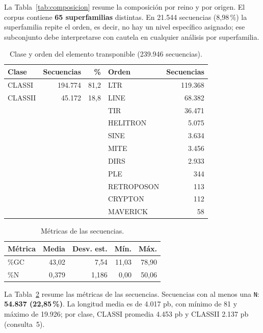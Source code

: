\documentclass[journal]{IEEEtran}
\begin{document}
La Tabla~\ref{tab:composicion} resume la composición por reino y por origen. El corpus
contiene \textbf{65 superfamilias} distintas. En 21.544 secuencias (8,98\,\%) la
superfamilia repite el orden, es decir, no hay un nivel específico asignado; ese
subconjunto debe interpretarse con cautela en cualquier análisis por superfamilia.

\begin{table}[!t]
\caption{Clase y orden del elemento transponible (239.946 secuencias).}
\label{tab:clase_orden}
\centering
\footnotesize
\setlength{\tabcolsep}{3pt}
\begin{tabular}{@{}lrrlr@{}}
\toprule
Clase & Secuencias & \% & Orden & Secuencias \\
\midrule
CLASSI & 194.774 & 81,2 & LTR & 119.368 \\
CLASSII & 45.172 & 18,8 & LINE & 68.382 \\
 & & & TIR & 36.471 \\
 & & & HELITRON & 5.075 \\
 & & & SINE & 3.634 \\
 & & & MITE & 3.456 \\
 & & & DIRS & 2.933 \\
 & & & PLE & 344 \\
 & & & RETROPOSON & 113 \\
 & & & CRYPTON & 112 \\
 & & & MAVERICK & 58 \\
\bottomrule
\end{tabular}
\end{table}

\begin{table}[!t]
\caption{Métricas de las secuencias.}
\label{tab:metricas}
\centering
\footnotesize
\begin{tabular}{@{}lrrrr@{}}
\toprule
Métrica & Media & Desv. est. & Mín. & Máx. \\
\midrule
\%GC & 43,02 & 7,54 & 11,03 & 78,90 \\
\%N & 0,379 & 1,186 & 0,00 & 50,06 \\
\bottomrule
\end{tabular}
\end{table}

La Tabla~\ref{tab:metricas} resume las métricas de las secuencias. Secuencias con al menos
una \texttt{N}: \textbf{54.837 (22,85\,\%)}. La longitud media es de 4.017 pb, con mínimo
de 81 y máximo de 19.926; por clase, CLASSI promedia 4.453 pb y CLASSII 2.137 pb
(consulta~5).
\end{document}
